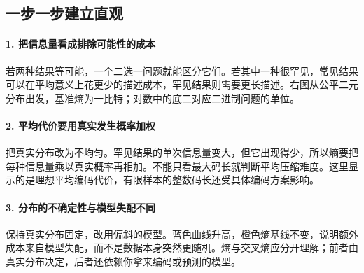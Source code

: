 \subsection*{一步一步建立直观}

\paragraph{1. 把信息量看成排除可能性的成本}

若两种结果等可能，一个二选一问题就能区分它们。若其中一种很罕见，常见结果可以在平均意义上花更少的描述成本，罕见结果则需要更长描述。右图从公平二元分布出发，基准熵为一比特；对数中的底二对应二进制问题的单位。



\paragraph{2. 平均代价要用真实发生概率加权}

把真实分布改为不均匀。罕见结果的单次信息量变大，但它出现得少，所以熵要把每种信息量乘以真实概率再相加。不能只看最大码长就判断平均压缩难度。这里显示的是理想平均编码代价，有限样本的整数码长还受具体编码方案影响。



\paragraph{3. 分布的不确定性与模型失配不同}

保持真实分布固定，改用偏斜的模型。蓝色曲线升高，橙色熵基线不变，说明额外成本来自模型失配，而不是数据本身突然更随机。熵与交叉熵应分开理解；前者由真实分布决定，后者还依赖你拿来编码或预测的模型。

